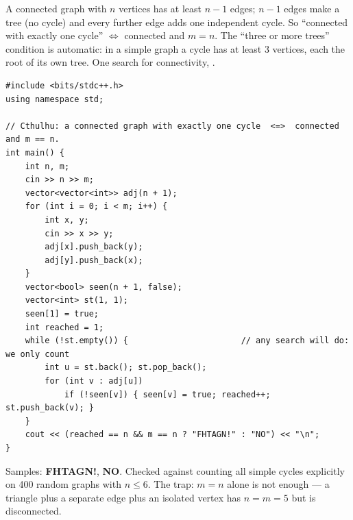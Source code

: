 \begin{solutionbox}[E1.2 Cthulhu]
A connected graph with $n$ vertices has at least $n - 1$ edges; $n - 1$ edges make a tree (no cycle) and every further edge adds one independent cycle. So ``connected with exactly one cycle'' $\iff$ connected and $m = n$. The ``three or more trees'' condition is automatic: in a simple graph a cycle has at least 3 vertices, each the root of its own tree. One search for connectivity, .
\begin{lstlisting}[style=cpp]
#include <bits/stdc++.h>
using namespace std;

// Cthulhu: a connected graph with exactly one cycle  <=>  connected and m == n.
int main() {
    int n, m;
    cin >> n >> m;
    vector<vector<int>> adj(n + 1);
    for (int i = 0; i < m; i++) {
        int x, y;
        cin >> x >> y;
        adj[x].push_back(y);
        adj[y].push_back(x);
    }
    vector<bool> seen(n + 1, false);
    vector<int> st(1, 1);
    seen[1] = true;
    int reached = 1;
    while (!st.empty()) {                       // any search will do: we only count
        int u = st.back(); st.pop_back();
        for (int v : adj[u])
            if (!seen[v]) { seen[v] = true; reached++; st.push_back(v); }
    }
    cout << (reached == n && m == n ? "FHTAGN!" : "NO") << "\n";
}
\end{lstlisting}
Samples: \textbf{FHTAGN!}, \textbf{NO}. Checked against counting all simple cycles explicitly on 400 random graphs with $n \le 6$. The trap: $m = n$ alone is not enough --- a triangle plus a separate edge plus an isolated vertex has $n = m = 5$ but is disconnected.
\end{solutionbox}

